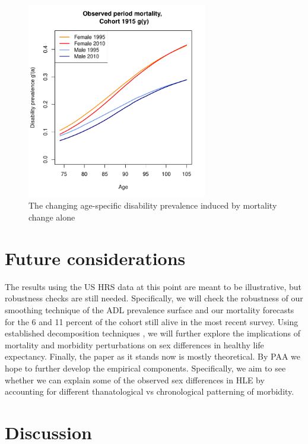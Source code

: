 \documentclass[11pt,oneside,a4paper]{article} %
\begin{document}
\begin{figure}
	\centering
		\includegraphics[width=0.7\textwidth]{Figures/morb_by_age_1915gy.pdf}
	\caption{The changing age-specific disability prevalence induced by mortality change alone}
	\label{fig:morb_age}
\end{figure}



\section{Future considerations}
The results using the US HRS data at this point are meant to be illustrative, but robustness checks are still needed. Specifically, we will check the robustness of our smoothing technique of the ADL prevalence surface and our mortality forecasts for the 6 and 11 percent of the cohort still alive in the most recent survey. Using established decomposition techniques \citep{Andreev2002,Horiuchi2008}, we will further explore the implications of mortality and morbidity perturbations on sex differences in healthy life expectancy. 
Finally, the paper as it stands now is mostly theoretical. By PAA we hope to further develop the empirical components. Specifically, we aim to see whether we can explain some of the observed sex differences in HLE by accounting for different thanatological vs chronological patterning of morbidity.


\section{Discussion}
\end{document}
